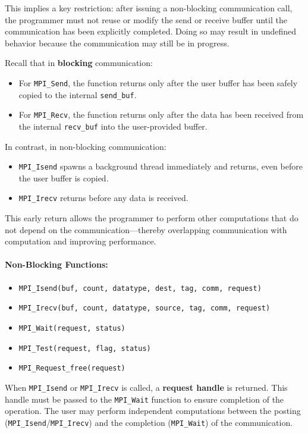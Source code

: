 \documentclass[12pt]{book}
\begin{document}
This implies a key restriction: after issuing a non-blocking communication call, the programmer must not reuse or modify the send or receive buffer until the communication has been explicitly completed. Doing so may result in undefined behavior because the communication may still be in progress.

Recall that in \textbf{blocking} communication:
\begin{itemize}
    \item For \texttt{MPI\_Send}, the function returns only after the user buffer has been safely copied to the internal \texttt{send\_buf}.
    \item For \texttt{MPI\_Recv}, the function returns only after the data has been received from the internal \texttt{recv\_buf} into the user-provided buffer.
\end{itemize}

In contrast, in non-blocking communication:
\begin{itemize}
    \item \texttt{MPI\_Isend} spawns a background thread immediately and returns, even before the user buffer is copied.
    \item \texttt{MPI\_Irecv} returns before any data is received.
\end{itemize}

This early return allows the programmer to perform other computations that do not depend on the communication—thereby overlapping communication with computation and improving performance.

\paragraph{Non-Blocking Functions:}
\begin{itemize}
    \item \texttt{MPI\_Isend(buf, count, datatype, dest, tag, comm, request)}
    \item \texttt{MPI\_Irecv(buf, count, datatype, source, tag, comm, request)}
    \item \texttt{MPI\_Wait(request, status)}
    \item \texttt{MPI\_Test(request, flag, status)}
    \item \texttt{MPI\_Request\_free(request)}
\end{itemize}

When \texttt{MPI\_Isend} or \texttt{MPI\_Irecv} is called, a \textbf{request handle} is returned. This handle must be passed to the \texttt{MPI\_Wait} function to ensure completion of the operation. The user may perform independent computations between the posting (\texttt{MPI\_Isend}/\texttt{MPI\_Irecv}) and the completion (\texttt{MPI\_Wait}) of the communication.
\end{document}
